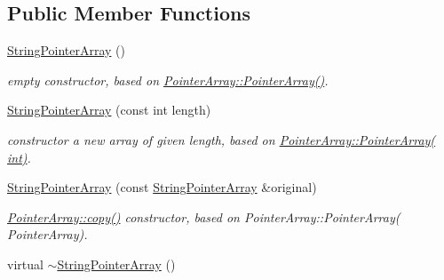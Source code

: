 \subsection*{Public Member Functions}
\begin{DoxyCompactItemize}
\item 
\hypertarget{classparray_1_1StringPointerArray_a3dcc569f7833b31b26bb72570bdc7067}{\hyperlink{classparray_1_1StringPointerArray_a3dcc569f7833b31b26bb72570bdc7067}{String\-Pointer\-Array} ()}\label{classparray_1_1StringPointerArray_a3dcc569f7833b31b26bb72570bdc7067}

\begin{DoxyCompactList}\small\item\em empty constructor, based on \hyperlink{classparray_1_1PointerArray_ab506b284822d1e013813579e06893797}{Pointer\-Array\-::\-Pointer\-Array()}. \end{DoxyCompactList}\item 
\hypertarget{classparray_1_1StringPointerArray_ae31ac6c33c13c602d3cbee3ca4aed10c}{\hyperlink{classparray_1_1StringPointerArray_ae31ac6c33c13c602d3cbee3ca4aed10c}{String\-Pointer\-Array} (const int length)}\label{classparray_1_1StringPointerArray_ae31ac6c33c13c602d3cbee3ca4aed10c}

\begin{DoxyCompactList}\small\item\em constructor a new array of given length, based on \hyperlink{classparray_1_1PointerArray_a4e39d7adf15e94c02dfe2662c181f0c6}{Pointer\-Array\-::\-Pointer\-Array( int)}. \end{DoxyCompactList}\item 
\hypertarget{classparray_1_1StringPointerArray_a6566d7032d0c519b440220df77651345}{\hyperlink{classparray_1_1StringPointerArray_a6566d7032d0c519b440220df77651345}{String\-Pointer\-Array} (const \hyperlink{classparray_1_1StringPointerArray}{String\-Pointer\-Array} \&original)}\label{classparray_1_1StringPointerArray_a6566d7032d0c519b440220df77651345}

\begin{DoxyCompactList}\small\item\em \hyperlink{classparray_1_1PointerArray_a3010540e156076377ffd4428b05e1ac2}{Pointer\-Array\-::copy()} constructor, based on Pointer\-Array\-::\-Pointer\-Array( Pointer\-Array). \end{DoxyCompactList}\item 
\hypertarget{classparray_1_1StringPointerArray_a66e413fa7aedbfe9b45c87d8641ea36e}{virtual \hyperlink{classparray_1_1StringPointerArray_a66e413fa7aedbfe9b45c87d8641ea36e}{$\sim$\-String\-Pointer\-Array} ()}\label{classparray_1_1StringPointerArray_a66e413fa7aedbfe9b45c87d8641ea36e}


\end{DoxyCompactItemize}
